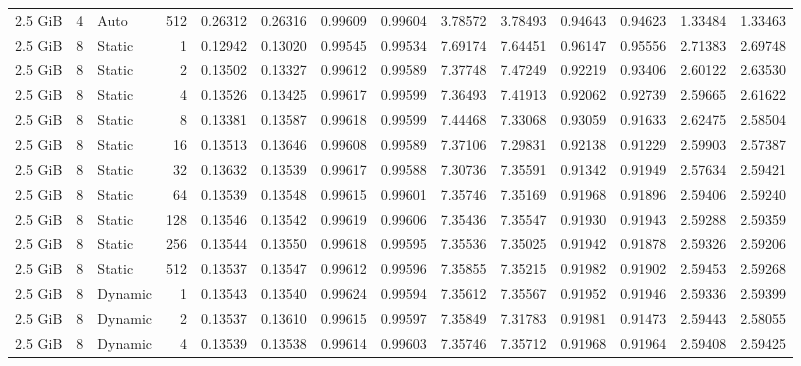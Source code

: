 \begin{table}[H]
\begin{adjustbox}{width=\textwidth, keepaspectratio}
\begin{tabular}{rrlrrrrrrrrrrr}
                    2.5 GiB & 4 & Auto & 512 & 0.26312 & 0.26316 & 0.99609 & 0.99604 & 3.78572 & 3.78493 & 0.94643 & 0.94623 & 1.33484 & 1.33463 \\
                    2.5 GiB & 8 & Static & 1 & 0.12942 & 0.13020 & 0.99545 & 0.99534 & 7.69174 & 7.64451 & 0.96147 & 0.95556 & 2.71383 & 2.69748 \\
                    2.5 GiB & 8 & Static & 2 & 0.13502 & 0.13327 & 0.99612 & 0.99589 & 7.37748 & 7.47249 & 0.92219 & 0.93406 & 2.60122 & 2.63530 \\
                    2.5 GiB & 8 & Static & 4 & 0.13526 & 0.13425 & 0.99617 & 0.99599 & 7.36493 & 7.41913 & 0.92062 & 0.92739 & 2.59665 & 2.61622 \\
                    2.5 GiB & 8 & Static & 8 & 0.13381 & 0.13587 & 0.99618 & 0.99599 & 7.44468 & 7.33068 & 0.93059 & 0.91633 & 2.62475 & 2.58504 \\
                    2.5 GiB & 8 & Static & 16 & 0.13513 & 0.13646 & 0.99608 & 0.99589 & 7.37106 & 7.29831 & 0.92138 & 0.91229 & 2.59903 & 2.57387 \\
                    2.5 GiB & 8 & Static & 32 & 0.13632 & 0.13539 & 0.99617 & 0.99588 & 7.30736 & 7.35591 & 0.91342 & 0.91949 & 2.57634 & 2.59421 \\
                    2.5 GiB & 8 & Static & 64 & 0.13539 & 0.13548 & 0.99615 & 0.99601 & 7.35746 & 7.35169 & 0.91968 & 0.91896 & 2.59406 & 2.59240 \\
                    2.5 GiB & 8 & Static & 128 & 0.13546 & 0.13542 & 0.99619 & 0.99606 & 7.35436 & 7.35547 & 0.91930 & 0.91943 & 2.59288 & 2.59359 \\
                    2.5 GiB & 8 & Static & 256 & 0.13544 & 0.13550 & 0.99618 & 0.99595 & 7.35536 & 7.35025 & 0.91942 & 0.91878 & 2.59326 & 2.59206 \\
                    2.5 GiB & 8 & Static & 512 & 0.13537 & 0.13547 & 0.99612 & 0.99596 & 7.35855 & 7.35215 & 0.91982 & 0.91902 & 2.59453 & 2.59268 \\
                    2.5 GiB & 8 & Dynamic & 1 & 0.13543 & 0.13540 & 0.99624 & 0.99594 & 7.35612 & 7.35567 & 0.91952 & 0.91946 & 2.59336 & 2.59399 \\
                    2.5 GiB & 8 & Dynamic & 2 & 0.13537 & 0.13610 & 0.99615 & 0.99597 & 7.35849 & 7.31783 & 0.91981 & 0.91473 & 2.59443 & 2.58055 \\
                    2.5 GiB & 8 & Dynamic & 4 & 0.13539 & 0.13538 & 0.99614 & 0.99603 & 7.35746 & 7.35712 & 0.91968 & 0.91964 & 2.59408 & 2.59425 \\

\end{tabular}
\end{adjustbox}
\end{table}
